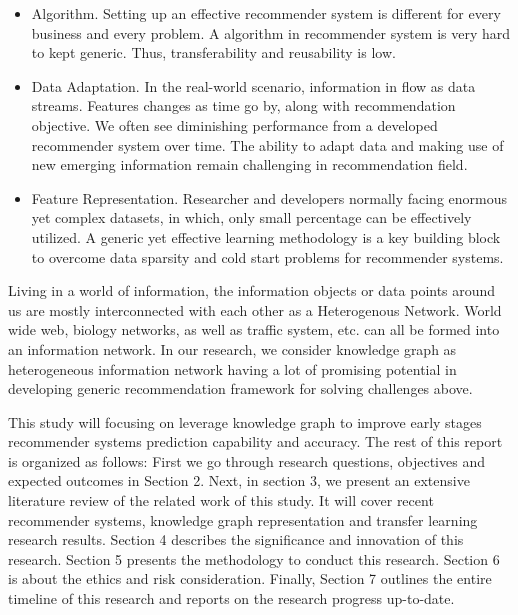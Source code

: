 \begin{itemize}
\item Algorithm. Setting up an effective recommender system is different for every business and every problem. A algorithm in recommender system is very hard to kept generic. Thus, transferability and reusability is low.

\item Data Adaptation. In the real-world scenario, information in flow as data streams. Features changes as time go by, along with recommendation objective. We often see diminishing performance from a developed recommender system over time. The ability to adapt data and making use of new emerging information remain challenging in recommendation field.

\item Feature Representation. Researcher and developers normally facing enormous yet complex datasets, in which, only small percentage can be effectively utilized. A generic yet effective learning methodology is a key building block to overcome data sparsity and cold start problems for recommender systems.
\end{itemize}

Living in a world of information, the information objects or data points around us are mostly interconnected with each other as a Heterogenous Network. World wide web, biology networks, as well as traffic system, etc. can all be formed into an information network. In our research, we consider knowledge graph as heterogeneous information network having a lot of promising potential in developing generic recommendation framework for solving challenges above.

This study will focusing on leverage knowledge graph to improve early stages recommender systems prediction capability and accuracy. The rest of this report is organized as follows: 
First we go through research questions, objectives and expected outcomes in Section 2. Next, in section 3, we present an extensive literature review of the related work of this study. It will cover recent recommender systems, knowledge graph representation and transfer learning research results. Section 4 describes the significance and innovation of this research. Section 5 presents the methodology to conduct this research. Section 6 is about the ethics and risk consideration. Finally, Section 7 outlines the entire timeline of this research and reports on the research progress up-to-date.


